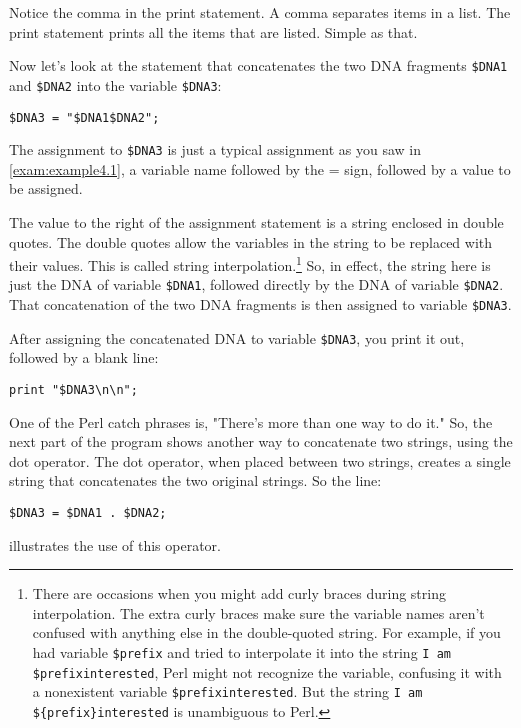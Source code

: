 Notice the comma in the print statement. A comma separates items in a list. The print statement prints all the items that are listed. Simple as that.

Now let's look at the statement that concatenates the two DNA fragments \verb|$DNA1| and \verb|$DNA2| into the variable \verb|$DNA3|:

\begin{lstlisting}
$DNA3 = "$DNA1$DNA2"; 
\end{lstlisting}

The assignment to \verb|$DNA3| is just a typical assignment as you saw in \autoref{exam:example4.1}, a variable name followed by the = sign, followed by a value to be assigned.

The value to the right of the assignment statement is a string enclosed in double quotes. The double quotes allow the variables in the string to be replaced with their values. This is called string interpolation.\footnote{There are occasions when you might add curly braces during string interpolation. The extra curly braces make sure the variable names aren't confused with anything else in the double-quoted string. For example, if you had variable \verb|$prefix| and tried to interpolate it into the string \verb|I am $prefixinterested|, Perl might not recognize the variable, confusing it with a nonexistent variable \verb|$prefixinterested|. But the string \verb|I am ${prefix}interested| is unambiguous to Perl.} So, in effect, the string here is just the DNA of variable \verb|$DNA1|, followed directly by the DNA of variable \verb|$DNA2|. That concatenation of the two DNA fragments is then assigned to variable \verb|$DNA3|.

After assigning the concatenated DNA to variable \verb|$DNA3|, you print it out, followed by a blank line:

\begin{lstlisting}
print "$DNA3\n\n";
\end{lstlisting}

One of the Perl catch phrases is, "There's more than one way to do it." So, the next part of the program shows another way to concatenate two strings, using the dot operator. The dot operator, when placed between two strings, creates a single string that concatenates the two original strings. So the line:

\begin{lstlisting}
$DNA3 = $DNA1 . $DNA2;
\end{lstlisting}

illustrates the use of this operator.


